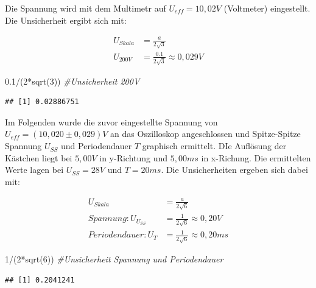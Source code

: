 \documentclass[
  9pt,
]{article}
\newenvironment{Shaded}{\begin{snugshade}}{\end{snugshade}}
\newcommand{\CommentTok}[1]{\textcolor[rgb]{0.56,0.35,0.01}{\textit{#1}}}
\newcommand{\DecValTok}[1]{\textcolor[rgb]{0.00,0.00,0.81}{#1}}
\newcommand{\FloatTok}[1]{\textcolor[rgb]{0.00,0.00,0.81}{#1}}
\newcommand{\FunctionTok}[1]{\textcolor[rgb]{0.00,0.00,0.00}{#1}}
\newcommand{\NormalTok}[1]{#1}
\newcommand{\SpecialCharTok}[1]{\textcolor[rgb]{0.00,0.00,0.00}{#1}}
\begin{document}
Die Spannung wird mit dem Multimetr auf \(U_{eff} = 10,02 V\)
(Voltmeter) eingestellt. Die Unsicherheit ergibt sich mit:

\begin{equation*}
\begin{split}
U_{Skala}&= \frac{a}{2\sqrt{3}} \\
U_{200V} &= \frac{0.1}{2\sqrt{3}} \approx 0,029V 
\end{split}
\end{equation*}

\begin{Shaded}
\begin{Highlighting}[]
\FloatTok{0.1}\SpecialCharTok{/}\NormalTok{(}\DecValTok{2}\SpecialCharTok{*}\FunctionTok{sqrt}\NormalTok{(}\DecValTok{3}\NormalTok{)) }\CommentTok{\#Unsicherheit 200V}
\end{Highlighting}
\end{Shaded}

\begin{verbatim}
## [1] 0.02886751
\end{verbatim}

Im Folgenden wurde die zuvor eingestellte Spannung von
\(U_{eff} = (10,020\pm 0,029) V\) an das Oszilloskop angeschlossen und
Spitze-Spitze Spannung \(U_{SS}\) und Periodendauer \(T\) graphisch
ermittelt. DIe Auflösung der Kästchen liegt bei \(5,00V\) in y-Richtung
und \(5,00ms\) in x-Richung. Die ermittelten Werte lagen bei
\(U_{SS} = 28V\) und \(T = 20ms\). Die Unsicherheiten ergeben sich dabei
mit:

\begin{equation*}
\begin{split}
U_{Skala} &= \frac{a}{2\sqrt{6}} \\
Spannung: U_{U_{SS}} &= \frac{1}{2\sqrt{6}} \approx 0,20V \\
Periodendauer: U_T &= \frac{1}{2\sqrt{6}} \approx 0,20ms 
\end{split}
\end{equation*}

\begin{Shaded}
\begin{Highlighting}[]
\DecValTok{1}\SpecialCharTok{/}\NormalTok{(}\DecValTok{2}\SpecialCharTok{*}\FunctionTok{sqrt}\NormalTok{(}\DecValTok{6}\NormalTok{)) }\CommentTok{\#Unsicherheit Spannung und Periodendauer}
\end{Highlighting}
\end{Shaded}

\begin{verbatim}
## [1] 0.2041241
\end{verbatim}
\end{document}
